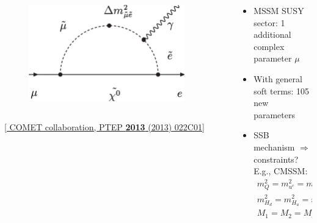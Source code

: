 \documentclass[10pt,aspectratio=169]{beamer}
\begin{document}
\begin{frame}
\begin{columns}[t]
\begin{column}{0.5\textwidth}
\begin{columns}[t]
\begin{column}{0.5\textwidth}
          \begin{figure}
            \includegraphics[width=0.9\textwidth]{comet_mssm_clfv}
          \end{figure}
      \end{column}
      \end{columns}
      \begin{center}
        { \tiny [\href{http://dx.doi.org/10.1093/ptep/pts089}{%
              COMET collaboration, PTEP \textbf{2013} (2013) 022C01}]
        }
      \end{center}
    \end{column}
    \begin{column}{0.5\textwidth}
      \begin{itemize}\itemsep1em
      \item MSSM SUSY sector: {\color{blue} 1 additional complex parameter
        $\mu$}
      \item With general soft terms: \alert{105 new parameters}
      \item SSB mechanism $\Rightarrow$ constraints? E.g., CMSSM:
        \begin{gather*}
          m_Q^2 = m_{u^c}^2 = m_{d^c}^2 = m_L^2 = m_{e^c}^2 = m_0^2 \bm{1} \\
          m_{H_d}^2 = m_{H_u}^2 = m_0^2, \quad
          T^{u,d,e} = y^{u,d,e} A_0 \bm{1} \\
          M_1 = M_2 = M_3 = M_{1/2}
        \end{gather*}
      \end{itemize}
    \end{column}
  \end{columns}
\end{frame}
\end{document}
